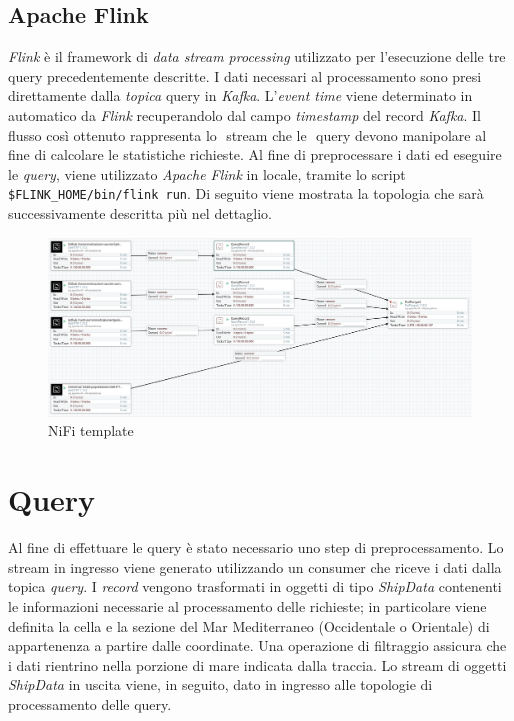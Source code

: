 \documentclass[conference]{IEEEtran}
\begin{document}
\subsection*{\textbf{Apache Flink}}
\emph{Flink} \`{e} il framework di \emph{data stream processing} utilizzato per
l'esecuzione delle tre query precedentemente descritte.
I dati necessari al processamento sono presi direttamente
dalla \emph{topica} query in \emph{Kafka}. L'\emph{event time} viene determinato in automatico da \emph{Flink} recuperandolo dal campo \emph{timestamp} del record \emph{Kafka}. Il flusso cos\`{i} ottenuto rappresenta lo ​ stream che le ​ query
devono manipolare al fine di calcolare le statistiche
richieste.
Al fine di preprocessare i dati ed eseguire le \emph{query}, viene utilizzato \emph{Apache Flink} in locale, tramite lo script \texttt{\$FLINK\_HOME/bin/flink run}.
Di seguito viene mostrata la topologia che sarà
successivamente descritta più nel dettaglio.

\begin{figure}[htbp]
\includegraphics[scale=0.16]{Screenshot/Nifi.png}
\caption{NiFi template}\label{figura:template}
\label{fig}
\end{figure}


\section{\textbf{Query}}
\par Al fine di effettuare le query \`{e} stato necessario uno step di preprocessamento. Lo stream in ingresso viene generato utilizzando un consumer che riceve i dati dalla topica \emph{query}. I \emph{record} vengono trasformati in oggetti di tipo \emph{ShipData} contenenti le informazioni necessarie al processamento delle richieste; in particolare viene definita la cella e la sezione del Mar Mediterraneo (Occidentale o Orientale) di appartenenza a partire dalle coordinate. Una operazione di filtraggio assicura che i dati rientrino nella porzione di mare indicata dalla traccia. Lo stream di oggetti \emph{ShipData} in uscita viene, in seguito, dato in ingresso alle topologie di processamento delle query.
\end{document}
